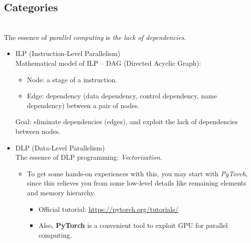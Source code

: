 \documentclass{article}
\begin{document}
\subsection{Categories}\\
The essence of \emph{parallel computing} is \emph{the lack of dependencies}.
\begin{itemize}
    \item ILP (Instruction-Level Parallelism)\\
    Mathematical model of ILP -- DAG (Directed Acyclic Graph):
    \begin{itemize}
        \item Node: a stage of a instruction.
        \item Edge: dependency (data dependency, control dependency, name dependency) between a pair of nodes.
    \end{itemize}
    Goal:
    eliminate dependencies (edges), and exploit the lack of dependencies between nodes.
    \item DLP (Data-Level Parallelism)\\
        The essence of DLP programming: \emph{Vectorization}.
        \begin{itemize}
            \item To get some hands-on experiences with this, you may start with \emph{PyTorch}, since this relieves you from some low-level details like remaining elements and memory hierarchy.
            \begin{itemize}
                \item Official tutorial: \href{https://pytorch.org/tutorials/}{https://pytorch.org/tutorials/}
                \item Also, \textbf{PyTorch} is a convenient tool to exploit GPU for parallel computing.
            \end{itemize}
        \end{itemize}
        

\end{itemize}
\end{document}
